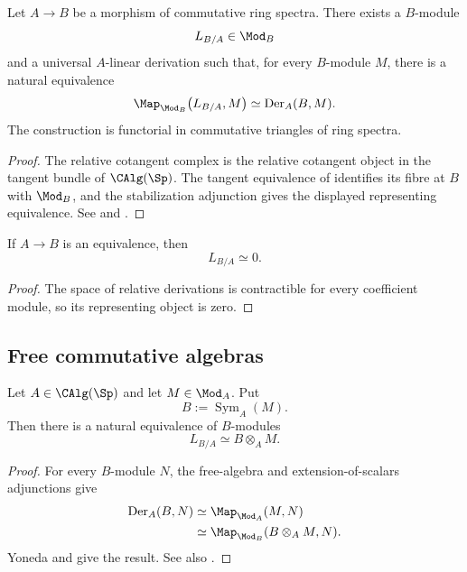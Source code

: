 \begin{theorem}
\label{thm:relative-cotangent-existence}
Let $A\to B$ be a morphism of commutative ring spectra. There exists a
$B$-module
\[
    L_{B/A}
    \in
    \Mod_B
\]
and a universal $A$-linear derivation such that, for every $B$-module
$M$, there is a natural equivalence
\[
    \Map_{\Mod_B}
    \bigl(
        L_{B/A},
        M
    \bigr)
    \simeq
    \operatorname{Der}_A(B,M).
\]
The construction is functorial in commutative triangles of ring spectra.
\end{theorem}

\begin{proof}
The relative cotangent complex is the relative cotangent object in the
tangent bundle of $\CAlg(\Sp)$. The tangent equivalence of
 identifies its fibre at $B$ with
$\Mod_B$, and the stabilization adjunction gives the displayed
representing equivalence. See
\cite[Sections~7.3.2--7.3.4]{LurieHigherAlgebra} and
\cite[Section~1]{LurieDAGIV}.
\end{proof}

\begin{corollary}
\label{cor:cotangent-equivalence-zero}
If $A\to B$ is an equivalence, then
\[
    L_{B/A}
    \simeq
    0.
\]
\end{corollary}

\begin{proof}
The space of relative derivations is contractible for every coefficient
module, so its representing object is zero.
\end{proof}

\subsection{Free commutative algebras}

\begin{proposition}
\label{prop:cotangent-free-algebra}
Let $A\in\CAlg(\Sp)$ and let $M\in\Mod_A$. Put
\[
    B
    :=
    \operatorname{Sym}_A(M).
\]
Then there is a natural equivalence of $B$-modules
\[
    L_{B/A}
    \simeq
    B\otimes_A M.
\]
\end{proposition}

\begin{proof}
For every $B$-module $N$, the free-algebra and extension-of-scalars
adjunctions give
\[
\begin{aligned}
    \operatorname{Der}_A(B,N)
    &\simeq
    \Map_{\Mod_A}(M,N)
    \\
    &\simeq
    \Map_{\Mod_B}(B\otimes_A M,N).
\end{aligned}
\]
Yoneda and  give the result.
See also \cite[Proposition~7.4.3.14]{LurieHigherAlgebra}.
\end{proof}

